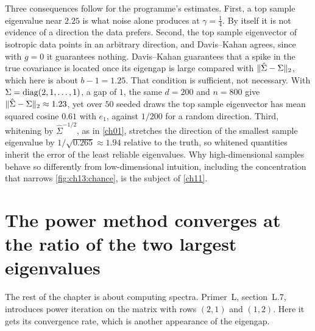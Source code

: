 Three consequences follow for the programme's estimates. First, a top sample
eigenvalue near $2.25$ is what noise alone produces at $\gamma=\tfrac14$. By
itself it is not evidence of a direction the data prefers. Second, the top sample
eigenvector of isotropic data points in an arbitrary direction, and Davis--Kahan
agrees, since with $g=0$ it guarantees nothing. Davis--Kahan guarantees that a
spike in the true covariance is located once its eigengap is large compared with
$\lVert \hat\Sigma-\Sigma\rVert_2$, which here is about $b-1=1.25$. That condition is
sufficient, not necessary. With $\Sigma=\operatorname{diag}(2,1,\dots,1)$, a gap of $1$, the
same $d=200$ and $n=800$ give $\lVert \hat\Sigma-\Sigma\rVert_2\approx1.23$, yet over
$50$ seeded draws the top sample eigenvector has mean squared cosine $0.61$ with
$e_1$, against $1/200$ for a random direction. Third, whitening by $\hat\Sigma^{-1/2}$, as in
\cref{ch01}, stretches the direction of the smallest sample eigenvalue by
$1/\sqrt{0.265}\approx1.94$ relative to the truth, so whitened quantities inherit the
error of the least reliable eigenvalues. Why high-dimensional samples behave so
differently from low-dimensional intuition, including the concentration that
narrows \cref{fig:ch13:chance}, is the subject of \cref{ch11}.



\section{The power method converges at the ratio of the two largest eigenvalues}\label{sec:ch13:power}

The rest of the chapter is about computing spectra. Primer~L, section~L.7,
introduces power iteration on the matrix with rows $(2,1)$ and $(1,2)$. Here it
gets its convergence rate, which is another appearance of the eigengap.

